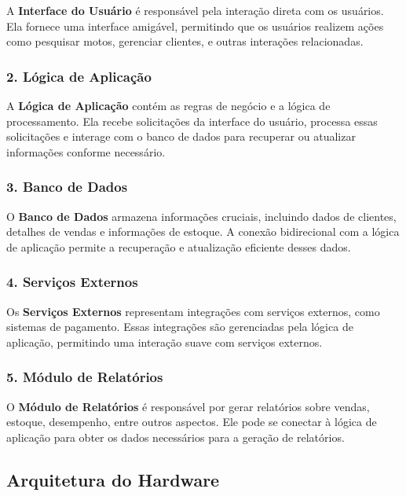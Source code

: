 	A \textbf{Interface do Usuário} é responsável pela interação direta com os usuários. Ela fornece uma interface amigável, permitindo que os usuários realizem ações como pesquisar motos, gerenciar clientes, e outras interações relacionadas.
	
	\subsubsection*{2. Lógica de Aplicação}
	
	A \textbf{Lógica de Aplicação} contém as regras de negócio e a lógica de processamento. Ela recebe solicitações da interface do usuário, processa essas solicitações e interage com o banco de dados para recuperar ou atualizar informações conforme necessário.
	
	\subsubsection*{3. Banco de Dados}
	
	O \textbf{Banco de Dados} armazena informações cruciais, incluindo dados de clientes, detalhes de vendas e informações de estoque. A conexão bidirecional com a lógica de aplicação permite a recuperação e atualização eficiente desses dados.
	
	\subsubsection*{4. Serviços Externos}
	
	Os \textbf{Serviços Externos} representam integrações com serviços externos, como sistemas de pagamento. Essas integrações são gerenciadas pela lógica de aplicação, permitindo uma interação suave com serviços externos.
	
	\subsubsection*{5. Módulo de Relatórios}
	
	O \textbf{Módulo de Relatórios} é responsável por gerar relatórios sobre vendas, estoque, desempenho, entre outros aspectos. Ele pode se conectar à lógica de aplicação para obter os dados necessários para a geração de relatórios.
	

    \subsection{Arquitetura do Hardware}


